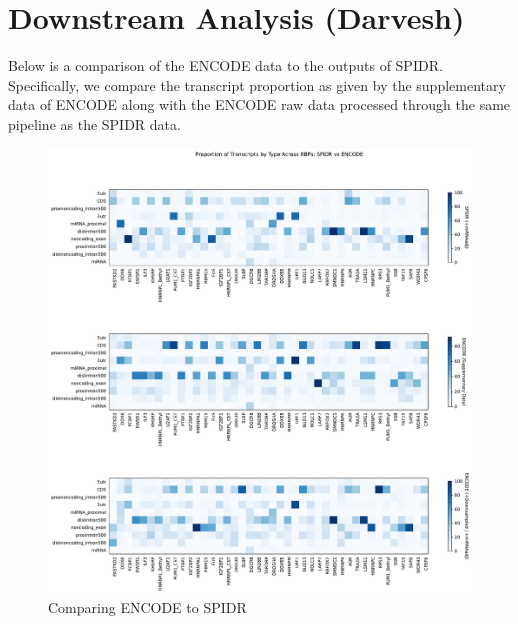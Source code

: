 \documentclass{article}
\begin{document}
    \section{Downstream Analysis (Darvesh)}
    Below is a comparison of the ENCODE data to the outputs of SPIDR. Specifically, we compare the transcript proportion as given by the supplementary data of ENCODE along with the ENCODE raw data processed through the same pipeline as the SPIDR data.
    \begin{figure}[!ht]
        \centering
        \includegraphics[scale=0.4]{../figures/heatmap_spidr_vs_encode_miRNAadj.pdf}
        \caption[short]{Comparing ENCODE to SPIDR }
    \end{figure}
    
\end{document}
